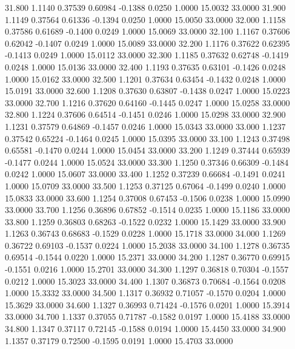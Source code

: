   31.800   1.1140   0.37539   0.60984  -0.1388   0.0250   1.0000  15.0032  33.0000
  31.900   1.1149   0.37564   0.61336  -0.1394   0.0250   1.0000  15.0050  33.0000
  32.000   1.1158   0.37586   0.61689  -0.1400   0.0249   1.0000  15.0069  33.0000
  32.100   1.1167   0.37606   0.62042  -0.1407   0.0249   1.0000  15.0089  33.0000
  32.200   1.1176   0.37622   0.62395  -0.1413   0.0249   1.0000  15.0112  33.0000
  32.300   1.1185   0.37632   0.62748  -0.1419   0.0248   1.0000  15.0136  33.0000
  32.400   1.1193   0.37635   0.63101  -0.1426   0.0248   1.0000  15.0162  33.0000
  32.500   1.1201   0.37634   0.63454  -0.1432   0.0248   1.0000  15.0191  33.0000
  32.600   1.1208   0.37630   0.63807  -0.1438   0.0247   1.0000  15.0223  33.0000
  32.700   1.1216   0.37620   0.64160  -0.1445   0.0247   1.0000  15.0258  33.0000
  32.800   1.1224   0.37606   0.64514  -0.1451   0.0246   1.0000  15.0298  33.0000
  32.900   1.1231   0.37579   0.64869  -0.1457   0.0246   1.0000  15.0343  33.0000
  33.000   1.1237   0.37542   0.65224  -0.1464   0.0245   1.0000  15.0395  33.0000
  33.100   1.1243   0.37498   0.65581  -0.1470   0.0244   1.0000  15.0454  33.0000
  33.200   1.1249   0.37444   0.65939  -0.1477   0.0244   1.0000  15.0524  33.0000
  33.300   1.1250   0.37346   0.66309  -0.1484   0.0242   1.0000  15.0607  33.0000
  33.400   1.1252   0.37239   0.66684  -0.1491   0.0241   1.0000  15.0709  33.0000
  33.500   1.1253   0.37125   0.67064  -0.1499   0.0240   1.0000  15.0833  33.0000
  33.600   1.1254   0.37008   0.67453  -0.1506   0.0238   1.0000  15.0990  33.0000
  33.700   1.1256   0.36896   0.67852  -0.1514   0.0235   1.0000  15.1186  33.0000
  33.800   1.1259   0.36803   0.68263  -0.1522   0.0232   1.0000  15.1429  33.0000
  33.900   1.1263   0.36743   0.68683  -0.1529   0.0228   1.0000  15.1718  33.0000
  34.000   1.1269   0.36722   0.69103  -0.1537   0.0224   1.0000  15.2038  33.0000
  34.100   1.1278   0.36735   0.69514  -0.1544   0.0220   1.0000  15.2371  33.0000
  34.200   1.1287   0.36770   0.69915  -0.1551   0.0216   1.0000  15.2701  33.0000
  34.300   1.1297   0.36818   0.70304  -0.1557   0.0212   1.0000  15.3023  33.0000
  34.400   1.1307   0.36873   0.70684  -0.1564   0.0208   1.0000  15.3332  33.0000
  34.500   1.1317   0.36932   0.71057  -0.1570   0.0204   1.0000  15.3629  33.0000
  34.600   1.1327   0.36993   0.71424  -0.1576   0.0201   1.0000  15.3914  33.0000
  34.700   1.1337   0.37055   0.71787  -0.1582   0.0197   1.0000  15.4188  33.0000
  34.800   1.1347   0.37117   0.72145  -0.1588   0.0194   1.0000  15.4450  33.0000
  34.900   1.1357   0.37179   0.72500  -0.1595   0.0191   1.0000  15.4703  33.0000
